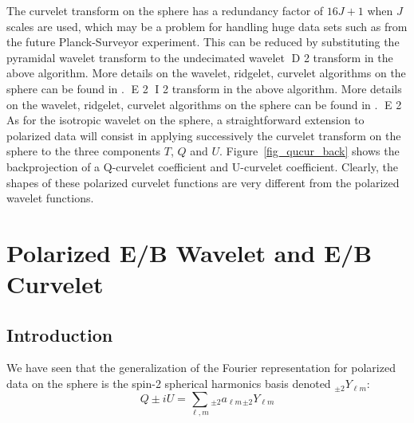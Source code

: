 The curvelet transform on the sphere has a redundancy factor of $16J + 1$ when $J$ scales are used, which may be a problem for handling huge data sets 
such as from the future Planck-Surveyor experiment. This can be reduced by substituting the pyramidal wavelet transform to the undecimated wavelet 
D 2
transform in the above algorithm. More details on the wavelet, ridgelet, curvelet algorithms on the sphere can be found in \cite{starck:sta05_2}. 
E 2
I 2
transform in the above algorithm. More details on the wavelet, ridgelet, curvelet algorithms on the sphere can be found in \citep{starck:sta05_2}. 
E 2
As for the isotropic wavelet on the sphere, a straightforward extension to polarized data will consist in applying successively the curvelet transform 
on the sphere to the three components $T$, $Q$ and $U$. Figure~\ref{fig_qucur_back} shows the backprojection of a Q-curvelet coefficient and 
U-curvelet coefficient. Clearly, the shapes of these polarized curvelet functions are very different from the polarized wavelet functions.%
\section{Polarized E/B Wavelet and E/B Curvelet}
\label{sec:pol_eb}

\subsection{Introduction}
We have seen that the generalization of the Fourier representation for polarized data on the sphere is the spin-2 spherical harmonics basis denoted $_{\pm 2}Y_{\ell m}$: 
\begin{equation} 
Q \pm i U  = \sum_{\ell, m}  { _{\pm 2}a_{\ell m}}   {_{\pm 2}Y_{\ell m} }
\end{equation} 
  
